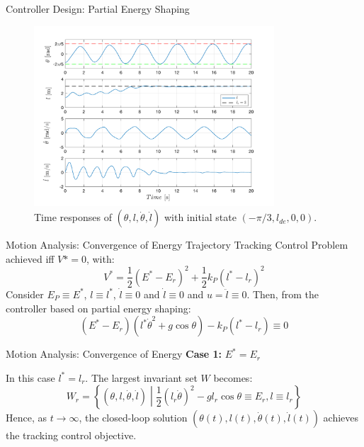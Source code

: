 \documentclass[10pt]{beamer}
\begin{document}
 \begin{frame}{Controller Design: Partial Energy Shaping}
    \begin{figure}
      \caption{Time responses of $(\theta, l, \dot{\theta}, \dot{l})$ with 
        initial state $(-\pi/3, l_{de}, 0, 0)$.}
      \vspace{-0.3cm}
      \includegraphics[width=0.8\textwidth]{images/partial_2b.pdf}
    \end{figure}
  \end{frame}

  \begin{frame}{Motion Analysis: Convergence of Energy}
    Trajectory Tracking Control Problem achieved iff $V*=0$, with:
    \begin{equation*}
      V^* = \frac{1}{2}(E^*-E_r)^2+\frac{1}{2}k_P(l^*-l_r)^2
    \end{equation*}
    Consider $E_P \equiv E^*$, $l \equiv l^*$, $\dot{l} \equiv 0$ and
    $\dot{l} \equiv 0$ and $u = \ddot{l} \equiv 0$. Then, from the controller
    based on partial energy shaping:
    \begin{equation*}
      (E^*-E_r)(l^*\dot{\theta}^2+g\cos\theta)-k_P(l^*-l_r) \equiv 0
    \end{equation*}
  \end{frame}

  \begin{frame}{Motion Analysis: Convergence of Energy}
    \noindent \textbf{Case 1:} $E^* = E_r$

    In this case $l^* = l_r$. The largest invariant set $W$ becomes:
    \begin{equation*}
      W_r = \left\{ (\theta, l, \dot{\theta}, \dot{l})
        \middle| \frac{1}{2} (l_r \dot{\theta})^2 -
        g l_r \cos\theta \equiv E_r, l \equiv l_r \right\}
    \end{equation*}
    Hence, as $t \to \infty$, the closed-loop solution
    $(\theta(t), l(t), \dot{\theta}(t), \dot{l}(t))$ achieves the
    tracking control objective.
  \end{frame}
\end{document}
